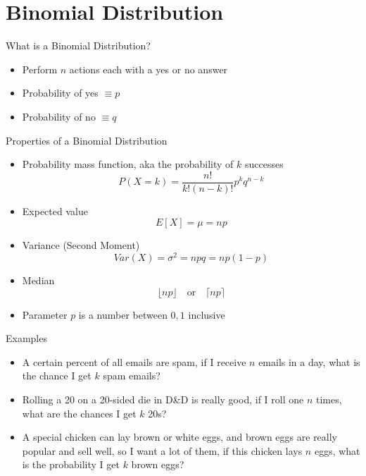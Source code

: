 \documentclass{beamer}
\begin{document}
\section{Binomial Distribution}
\begin{frame}{What is a Binomial Distribution?}
  \begin{itemize}
  \item Perform $n$ actions each with a yes or no answer
  \item Probability of yes $\equiv p$
  \item Probability of no $\equiv q$ 
  \end{itemize}
\end{frame}
\begin{frame}{Properties of a Binomial Distribution}
  \begin{itemize}
  \item Probability mass function, aka the probability of $k$ successes
    \begin{equation*}
      P(X=k)=\frac{n!}{k!(n-k)!}p^kq^{n-k}
    \end{equation*}
  \item Expected value
    \begin{equation*}
      E[X]=\mu=np
    \end{equation*}
  \item Variance (Second Moment)
    \begin{equation*}
      Var(X)=\sigma^2=npq=np(1-p)
    \end{equation*}
  \item Median
    \begin{equation*}
      \lfloor np\rfloor\quad\text{or}\quad\lceil np\rceil
    \end{equation*}
  \item Parameter $p$ is a number between $0,1$ inclusive
  \end{itemize}
\end{frame}
\begin{frame}{Examples}
  \begin{itemize}
  \item A certain percent of all emails are spam, if I receive $n$ emails in a day, what is the chance I get $k$ spam emails?
  \item Rolling a 20 on a 20-sided die in D\&D is really good, if I roll one $n$ times, what are the chances I get $k$ 20s?
  \item A special chicken can lay brown or white eggs, and brown eggs are really popular and sell well, so I want a lot of them, if this chicken lays $n$ eggs, what is the probability I get $k$ brown eggs?
  \end{itemize}
\end{frame}
\end{document}
